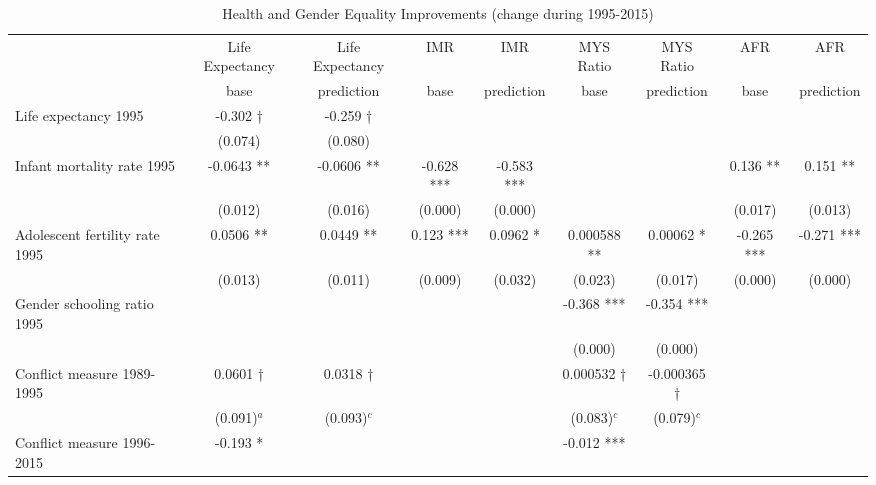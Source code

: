 \documentclass[12pt]{article}
\begin{document}
\begin{table}
\footnotesize
\centering
\caption{Health and Gender Equality Improvements (change during 1995-2015)}
\label{table_hg}
\begin{tabular}{lcccccccc}
\toprule
                               & Life Expectancy & Life Expectancy & IMR         & IMR        & MYS Ratio       & MYS Ratio   & AFR        & AFR\\
                               & base            & prediction      & base        & prediction & base            & prediction  & base       & prediction \\
\midrule
Life expectancy 1995           & -0.302 †        & -0.259 †        &             &            &                 &             &            & \\
                               & (0.074)         & (0.080)         &             &            &                 &             &            & \\
Infant mortality rate 1995     & -0.0643 **      & -0.0606 **      & -0.628 ***  & -0.583 *** &                 &             & 0.136 **   & 0.151 **\\
                               & (0.012)         & (0.016)         & (0.000)     & (0.000)    &                 &             & (0.017)    & (0.013) \\
Adolescent fertility rate 1995 & 0.0506 **       & 0.0449 **       & 0.123 ***   & 0.0962 *   & 0.000588 **     & 0.00062 *   & -0.265 *** & -0.271 ***\\
                               & (0.013)         & (0.011)         & (0.009)     & (0.032)    & (0.023)         & (0.017)     & (0.000)    & (0.000) \\
Gender schooling ratio 1995    &                 &                 &             &            & -0.368 ***      & -0.354 ***  &            & \\
                               &                 &                 &             &            & (0.000)         & (0.000)     &            & \\
Conflict measure 1989-1995     & 0.0601 †        & 0.0318 †        &             &            & 0.000532 †      & -0.000365 † &            & \\
                               & (0.091)$^a$     & (0.093)$^c$     &             &            & (0.083)$^c$     & (0.079)$^c$ &            & \\
Conflict measure 1996-2015     & -0.193 *        &                 &             &            & -0.012 ***      &             &            & \\

\end{tabular}
\end{table}
\end{document}

